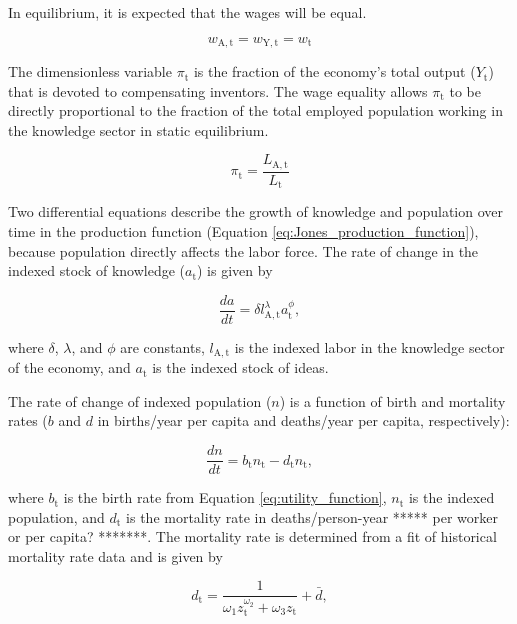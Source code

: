 \documentclass[letterpaper,12pt]{article}
\begin{document}
In equilibrium, it is expected that the wages will be equal.

\begin{equation} \label{eq:wage_equality}
	w_\mathrm{A,t} = w_\mathrm{Y,t} = w_\mathrm{t}
\end{equation}

The dimensionless variable $\pi_\mathrm{t}$ is the fraction of the economy's total output ($Y_\mathrm{t}$) that is devoted to compensating inventors. The wage equality allows $\pi_\mathrm{t}$ to be directly proportional to the fraction of the total employed population working in the knowledge sector in static equilibrium.

\begin{equation} \label{eq:pi}
	\pi_\mathrm{t} = \frac{L_\mathrm{A,t}}{L_\mathrm{t}}
\end{equation}

Two differential equations describe the growth of knowledge and population over time in the production function (Equation \ref{eq:Jones_production_function}), because population directly affects the labor force. The rate of change in the indexed stock of knowledge ($a_{\mathrm{t}}$) is given by

\begin{equation} \label{eq:da_dt}
	\frac{da}{dt} = \delta l_\mathrm{A,t}^\lambda a_\mathrm{t}^\phi,
\end{equation}

\noindent where $\delta$, $\lambda$, and $\phi$ are constants, $l_\mathrm{A,t}$ is the indexed labor in the knowledge sector of the economy, and $a_\mathrm{t}$ is the indexed stock of ideas.

The rate of change of indexed population ($n$) is a function of birth and mortality rates ($b$ and $d$ in births/year per capita and deaths/year per capita, respectively):

\begin{equation} \label{eq:dn_dt}
	\frac{dn}{dt} = b_\mathrm{t} n_\mathrm{t} - d_\mathrm{t} n_\mathrm{t},
\end{equation}

\noindent where $b_\mathrm{t}$ is the birth rate from Equation \ref{eq:utility_function}, $n_\mathrm{t}$ is the indexed population, and $d_\mathrm{t}$ is the mortality rate in deaths/person-year ***** per worker or per capita? *******. The mortality rate is determined from a fit of historical mortality rate data \citep{Jones:2001wn} and is given by

\begin{equation} \label{eq:mortality_rate}
	d_\mathrm{t} = \frac{1}{\omega_\mathrm{1} z_\mathrm{t}^{\omega_\mathrm{2}} + \omega_\mathrm{3} z_\mathrm{t}} + \bar d,
\end{equation}
\end{document}
